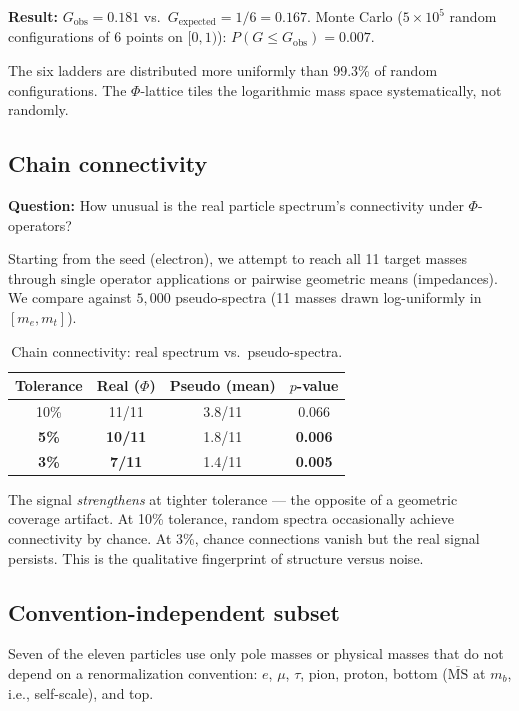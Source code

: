 \documentclass[11pt,a4paper]{article}
\begin{document}
\noindent
\textbf{Result:}
$G_\text{obs} = 0.181$ vs.\ $G_\text{expected} = 1/6 = 0.167$.
Monte Carlo ($5 \times 10^5$ random configurations of 6 points on
$[0,1)$): $P(G \leq G_\text{obs}) = 0.007$.

The six ladders are distributed more uniformly than 99.3\% of random
configurations. The $\Phi$-lattice tiles the logarithmic mass space
systematically, not randomly.

\subsection{Chain connectivity}
\label{sec:connectivity}

\textbf{Question:} How unusual is the real particle spectrum's
connectivity under $\Phi$-operators?

Starting from the seed (electron), we attempt to reach all 11 target
masses through single operator applications or pairwise geometric
means (impedances). We compare against $5{,}000$ pseudo-spectra
(11 masses drawn log-uniformly in $[m_e, m_t]$).

\begin{table}[H]
\centering
\caption{Chain connectivity: real spectrum vs.\ pseudo-spectra.}
\label{tab:connectivity}
\begin{tabular}{@{}cccc@{}}
\toprule
Tolerance & Real ($\Phi$) & Pseudo (mean) & $p$-value \\
\midrule
10\% & 11/11 & 3.8/11 & 0.066 \\
\textbf{5\%}  & \textbf{10/11} & 1.8/11 & \textbf{0.006} \\
\textbf{3\%}  & \textbf{7/11}  & 1.4/11 & \textbf{0.005} \\
\bottomrule
\end{tabular}
\end{table}

\noindent
The signal \emph{strengthens} at tighter tolerance --- the opposite
of a geometric coverage artifact. At 10\% tolerance, random spectra
occasionally achieve connectivity by chance. At 3\%, chance connections
vanish but the real signal persists. This is the qualitative
fingerprint of structure versus noise.

\subsection{Convention-independent subset}
\label{sec:convindep}

Seven of the eleven particles use only pole masses or physical masses
that do not depend on a renormalization convention: $e$, $\mu$, $\tau$,
pion, proton, bottom ($\overline{\text{MS}}$ at $m_b$, i.e.,
self-scale), and top.
\end{document}
